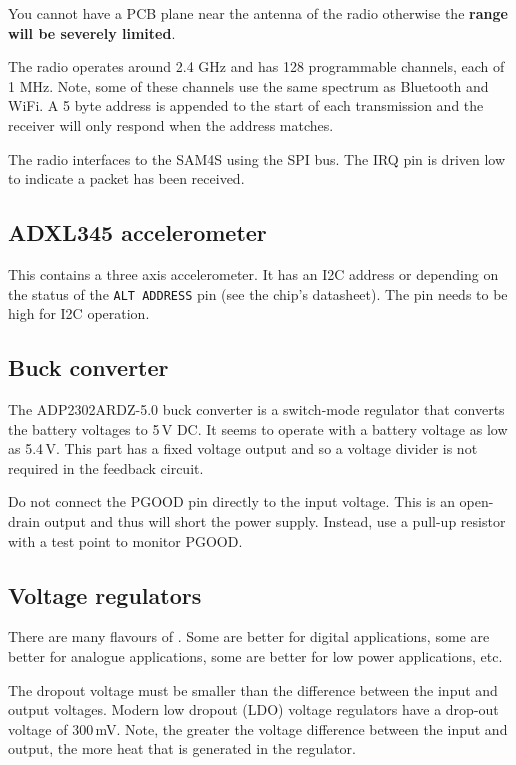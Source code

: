 You cannot have a PCB plane near the antenna of the radio otherwise
the \textbf{range will be severely limited}.

The radio operates around 2.4 GHz and has 128 programmable channels,
each of 1 MHz.  Note, some of these channels use the same spectrum as
Bluetooth and WiFi.  A 5 byte address is appended to the start of each
transmission and the receiver will only respond when the address
matches.

The radio interfaces to the SAM4S using the SPI bus. The IRQ
pin is driven low to indicate a packet has been received.



\subsection{ADXL345 accelerometer}
\label{adxl345-imu}

This contains a three axis accelerometer.  It has an I2C address
 or  depending on the status of the
\verb|ALT ADDRESS| pin (see the chip's datasheet).  The  pin
needs to be high for I2C operation.


\subsection{Buck converter}\label{buck-converter}

The ADP2302ARDZ-5.0 buck converter is a switch-mode regulator that
converts the battery voltages to 5\,V DC.  It seems to operate with a
battery voltage as low as 5.4\,V.  This part has a fixed voltage
output and so a voltage divider is not required in the feedback
circuit.

Do not connect the PGOOD pin directly to the input voltage.  This is
an open-drain output and thus will short the power supply.  Instead,
use a pull-up resistor with a test point to monitor PGOOD.


\subsection{Voltage regulators}\label{voltage-regulators}

There are many flavours of .
Some are better for digital applications, some are better for analogue
applications, some are better for low power applications, etc.

The dropout voltage must be smaller than the difference between the
input and output voltages.  Modern low dropout (LDO) voltage
regulators have a drop-out voltage of 300\,mV.  Note, the greater the
voltage difference between the input and output, the more heat that is
generated in the regulator.

